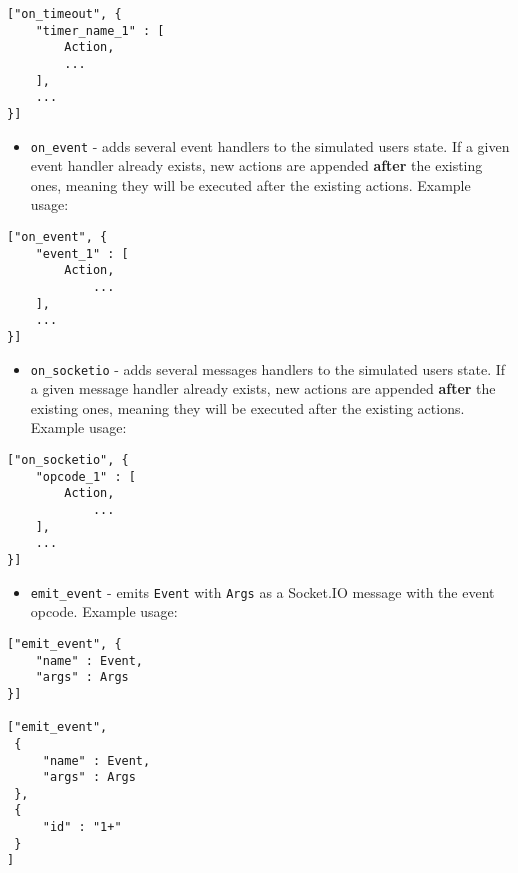 \documentclass[a4paper]{article}
\begin{document}
\begin{verbatim}
["on_timeout", {
    "timer_name_1" : [
        Action,
        ...
    ],
    ...
}]
\end{verbatim}





\begin{itemize}
\item \texttt{on\_event} - adds several event handlers to the simulated users state. If a given event handler already exists, new actions are appended \textbf{after} the existing ones, meaning they will be executed after the existing actions. Example usage:
\end{itemize}

\begin{verbatim}
["on_event", {
    "event_1" : [
        Action,
            ...
    ],
    ...
}]
\end{verbatim}





\begin{itemize}
\item \texttt{on\_socketio} - adds several messages handlers to the simulated users state. If a given message handler already exists, new actions are appended \textbf{after} the existing ones, meaning they will be executed after the existing actions. Example usage:
\end{itemize}

\begin{verbatim}
["on_socketio", {
    "opcode_1" : [
        Action,
            ...
    ],
    ...
}]
\end{verbatim}





\begin{itemize}
\item \texttt{emit\_event} - emits \texttt{Event} with \texttt{Args} as a Socket.IO message with the event opcode. Example usage:
\end{itemize}

\begin{verbatim}
["emit_event", {
    "name" : Event,
    "args" : Args
}]

["emit_event",
 {
     "name" : Event,
     "args" : Args
 },
 {
     "id" : "1+"
 }
]
\end{verbatim}
\end{document}
